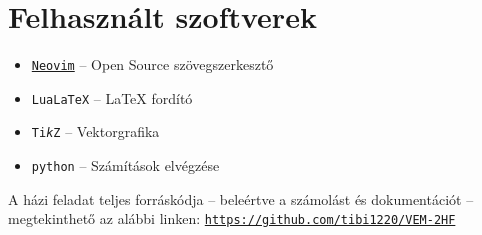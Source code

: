 \documentclass[a4paper, 12pt, table]{scrartcl}
\begin{document}

\allowdisplaybreaks

\def\a{{(a)}}
\def\b{{(b)}}
\def\c{{(c)}}
\def\d{{(d)}}







\clearpage
\tableofcontents

\vfill

\section*{Felhasznált szoftverek}

\begin{itemize}
  \item \href{https://neovim.io}{\texttt{Neovim}}
        \tabto{3.9cm} – \tabto{4.7cm}
        Open Source szövegszerkesztő

  \item \texttt{Lua\LaTeX}
        \tabto{3.9cm} – \tabto{4.7cm}
        \LaTeX{} fordító

  \item \texttt{Ti\textit{k}Z}
        \tabto{3.9cm} – \tabto{4.7cm}
        Vektorgrafika

  \item \texttt{python}
        \tabto{3.9cm} – \tabto{4.7cm}
        Számítások elvégzése
\end{itemize}

A házi feladat teljes forráskódja -- beleértve a számolást és dokumentációt --
megtekinthető az alábbi linken:
\texttt{\href{https://github.com/tibi1220/VEM-2HF}{https://github.com/tibi1220/VEM-2HF}}
\end{document}

